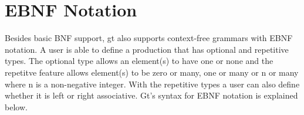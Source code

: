 \section{EBNF Notation}
Besides basic BNF support, gt also supports context-free grammars with EBNF notation. A user is able to define a 
production that has optional and repetitive types. The optional type allows an element(s) to have one or none and
the repetitve feature allows element(s) to be zero or many, one or many or n or many
where n is a non-negative integer. With the repetitive types a user can also define 
whether it is left or right associative.  Gt's syntax for EBNF notation is explained below.





